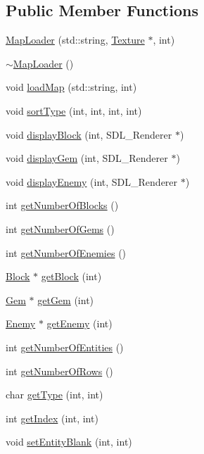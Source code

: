 \subsection*{Public Member Functions}
\begin{DoxyCompactItemize}
\item 
\hyperlink{class_map_loader_a759260eb5a2bcc71f4eb6e03e8d8dead}{Map\+Loader} (std\+::string, \hyperlink{class_texture}{Texture} $\ast$, int)
\item 
\hyperlink{class_map_loader_a6055310649b9a926301d7fb2b83cb1b1}{$\sim$\+Map\+Loader} ()
\item 
void \hyperlink{class_map_loader_aa3f95e47879ef5d2ac8f9b4e80602412}{load\+Map} (std\+::string, int)
\item 
void \hyperlink{class_map_loader_a5d094d7c804670f68e04c360cb9b5965}{sort\+Type} (int, int, int, int)
\item 
void \hyperlink{class_map_loader_a0430f4acdbe19fd6853a61e3b9f71543}{display\+Block} (int, S\+D\+L\+\_\+\+Renderer $\ast$)
\item 
void \hyperlink{class_map_loader_adf524d17cab14e1096341100abfe92b2}{display\+Gem} (int, S\+D\+L\+\_\+\+Renderer $\ast$)
\item 
void \hyperlink{class_map_loader_a15185be5ed6c623ca56d8719eddabe9f}{display\+Enemy} (int, S\+D\+L\+\_\+\+Renderer $\ast$)
\item 
int \hyperlink{class_map_loader_a178ca855ceec126f0a3a2264b74f63cc}{get\+Number\+Of\+Blocks} ()
\item 
int \hyperlink{class_map_loader_a407a5f1ad238e3048b5aaf0a7555c172}{get\+Number\+Of\+Gems} ()
\item 
int \hyperlink{class_map_loader_a553fdab4c534f6b72764545b01f83005}{get\+Number\+Of\+Enemies} ()
\item 
\hyperlink{class_block}{Block} $\ast$ \hyperlink{class_map_loader_a161a0cc6a392abc9baa57e919023f25c}{get\+Block} (int)
\item 
\hyperlink{class_gem}{Gem} $\ast$ \hyperlink{class_map_loader_a9b56fda5f4c27614131b085b449fe183}{get\+Gem} (int)
\item 
\hyperlink{class_enemy}{Enemy} $\ast$ \hyperlink{class_map_loader_a2680e99acdaf5b74b8116d43ca220df3}{get\+Enemy} (int)
\item 
int \hyperlink{class_map_loader_afb4ddc89be3ef11cf55cedd91796981c}{get\+Number\+Of\+Entities} ()
\item 
int \hyperlink{class_map_loader_ae5e282def1789a5f4701c44379b67813}{get\+Number\+Of\+Rows} ()
\item 
char \hyperlink{class_map_loader_a8e20a9a3c99f4d86d8db873b4a293352}{get\+Type} (int, int)
\item 
int \hyperlink{class_map_loader_a91978c6df4df7c8805ff7b959f2f8f02}{get\+Index} (int, int)
\item 
void \hyperlink{class_map_loader_a29c10edfe06895dd0e0f04275d96e5ed}{set\+Entity\+Blank} (int, int)
\end{DoxyCompactItemize}


